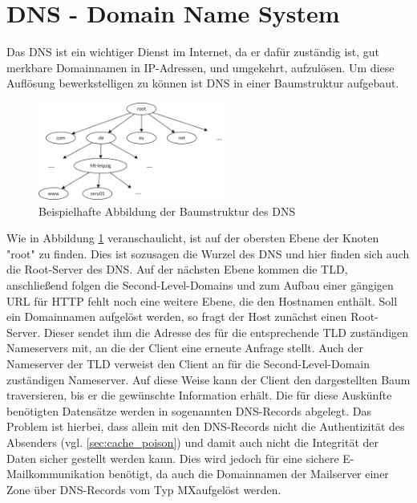 \documentclass  [paper=a4,
				fontsize=12pt,
				listof=totoc,
				bibliography=totoc
				]{scrreprt}
\begin{document}
	\section{DNS - Domain Name System}
	\label{sec:dns}
		Das \ac{DNS} ist ein wichtiger Dienst im Internet, da er dafür zuständig ist, gut merkbare Domainnamen in \ac{IP}-Adressen, und umgekehrt, aufzulösen.
		Um diese Auflösung bewerkstelligen zu können ist \ac{DNS} in einer Baumstruktur aufgebaut.
		
		\begin{figure}
			\vspace{-12pt}
			\centering
			\includegraphics[width=0.55\textwidth]{images/Baumstruktur_DNS.png}
			\caption[Baumstruktur des DNS]{Beispielhafte Abbildung der Baumstruktur des \ac{DNS}\footnotemark}
			\label{img:baumstruktur_dns}
			\vspace{-12pt}
		\end{figure}
		
		Wie in Abbildung \ref{img:baumstruktur_dns} veranschaulicht, ist auf der obersten Ebene der Knoten "root" zu finden.
		Dies ist sozusagen die Wurzel des \ac{DNS} und hier finden sich auch die Root-Server des \ac{DNS}.
		Auf der nächsten Ebene kommen die \ac{TLD}, anschließend folgen die Second-Level-Domains und zum Aufbau einer gängigen \ac{URL} für \ac{HTTP} fehlt noch eine weitere Ebene, die den Hostnamen enthält.
		Soll ein Domainnamen aufgelöst werden, so fragt der Host zunächst einen Root-Server.
		Dieser sendet ihm die Adresse des für die entsprechende \ac{TLD} zuständigen Nameservers mit, an die der Client eine erneute Anfrage stellt.
		Auch der Nameserver der \ac{TLD} verweist den Client an für die Second-Level-Domain zuständigen Nameserver.
		Auf diese Weise kann der Client den dargestellten Baum traversieren, bis er die gewünschte Information erhält.
		Die für diese Auskünfte benötigten Datensätze werden in sogenannten \ac{DNS}-Records abgelegt.
		Das Problem ist hierbei, dass allein mit den \ac{DNS}-Records nicht die Authentizität des Absenders (vgl. \ref{sec:cache_poison}) und damit auch nicht die Integrität der Daten sicher gestellt werden kann.
		Dies wird jedoch für eine sichere E-Mailkommunikation benötigt, da auch die Domainnamen der Mailserver einer Zone über \ac{DNS}-Records vom Typ \glqq MX\grqq aufgelöst werden.
\end{document}
